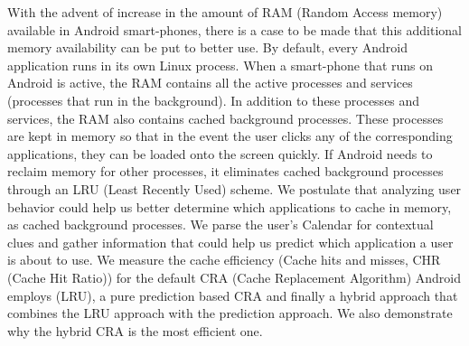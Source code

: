 \documentclass[12pt]{uthesis-v12}  %
\begin{document}

\begin{abstractpage}
With the advent of increase in the amount of RAM (Random Access memory) available in Android smart-phones, there is a case to be made that this additional memory availability can be put to better use. By default, every Android application runs in its own Linux process. When a smart-phone that runs on Android is active, the RAM contains all the active processes and services (processes that run in the background). In addition to these processes and services, the RAM also contains cached background processes. These processes are kept in memory so that in the event the user clicks any of the corresponding applications, they can be loaded onto the screen quickly. If Android needs to reclaim memory for other processes, it eliminates cached background processes through an LRU (Least Recently Used) scheme. We postulate that analyzing  user behavior could help us better determine which applications to cache in memory, as cached background processes. We parse the user's Calendar for contextual clues and gather information that could help us predict which application a user is about to use. We measure the cache efficiency (Cache hits and misses, CHR (Cache Hit Ratio)) for the default CRA (Cache Replacement Algorithm) Android employs (LRU), a pure prediction based CRA and finally a hybrid approach that combines the LRU approach with the prediction approach. We also demonstrate why the hybrid CRA is the most efficient one.


\end{abstractpage}

\end{document}
